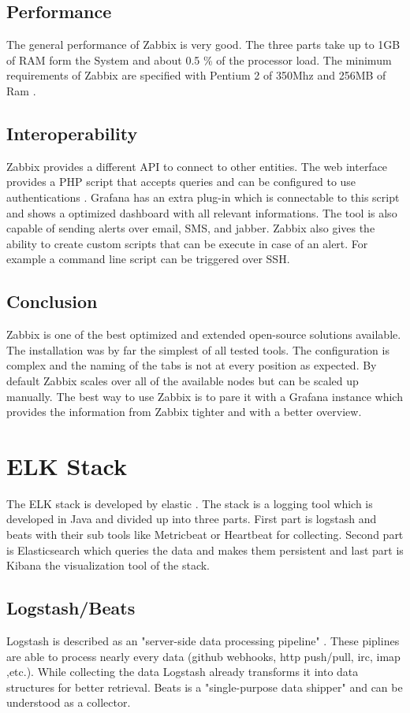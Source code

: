 \subsection{Performance}
The general performance of Zabbix is very good. The three parts take up to 1GB of RAM form the System and about 0.5 \% of the processor load. The minimum requirements of Zabbix are specified with Pentium 2 of 350Mhz and 256MB of Ram \cite{Marik2014}.
\subsection{Interoperability}
Zabbix provides a different API to connect to other entities. The web interface  provides a PHP script that accepts queries and can be configured to use authentications . Grafana has an extra plug-in which is connectable to this script and shows a optimized dashboard with all relevant informations. The tool is also capable of sending alerts over email, SMS, and jabber. Zabbix also gives the ability to create custom scripts that  can be execute in case of an alert. For example a command line script can be triggered over SSH. 
\subsection{Conclusion}
Zabbix is one of the best optimized and extended open-source solutions available. The installation was by far the simplest of all tested tools. The configuration is complex and the naming of the tabs is not at every position as expected. By default Zabbix scales over all of the available nodes but can be scaled up manually. The best way to use Zabbix is to pare it with a Grafana instance which provides the information from Zabbix tighter and with a better overview.

\section{ELK Stack}
\label{elk} %
The ELK stack is developed by elastic \cite{elasticsearch}. 
The stack is a logging tool which is developed in Java and divided up into three parts. First part is logstash and beats with their sub tools like Metricbeat or Heartbeat for collecting. Second part is Elasticsearch which queries the data and makes them persistent and last part is Kibana the visualization tool of the stack.
\subsection{Logstash/Beats}
Logstash is described as an 
"server-side data processing pipeline" \cite{elasticsearch}. These piplines are able to process nearly every data (github webhooks, http push/pull, irc, imap ,etc.).
While collecting the data Logstash already transforms it into data structures for better retrieval.
Beats is a "single-purpose data shipper" \cite{elasticsearch} and can be understood as a collector.
